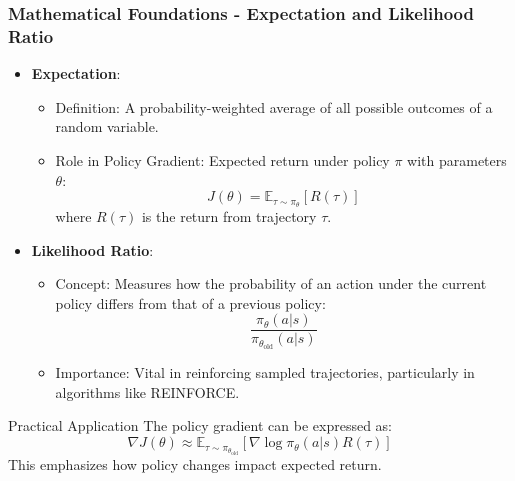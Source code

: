 \documentclass[aspectratio=169]{beamer}
\begin{document}
\begin{frame}[fragile]
    \frametitle{Mathematical Foundations - Expectation and Likelihood Ratio}
    \begin{itemize}
        \item \textbf{Expectation}:
          \begin{itemize}
            \item Definition: A probability-weighted average of all possible outcomes of a random variable.
            \item Role in Policy Gradient: Expected return under policy \( \pi \) with parameters \( \theta \):
              \[
              J(\theta) = \mathbb{E}_{\tau \sim \pi_{\theta}} [R(\tau)]
              \]
              where \( R(\tau) \) is the return from trajectory \( \tau \).
          \end{itemize}

        \item \textbf{Likelihood Ratio}:
          \begin{itemize}
            \item Concept: Measures how the probability of an action under the current policy differs from that of a previous policy:
              \[
              \frac{\pi_{\theta}(a|s)}{\pi_{\theta_{\text{old}}}(a|s)}
              \]
            \item Importance: Vital in reinforcing sampled trajectories, particularly in algorithms like REINFORCE.
          \end{itemize}
    \end{itemize}
    
    \begin{block}{Practical Application}
        The policy gradient can be expressed as:
        \[
        \nabla J(\theta) \approx \mathbb{E}_{\tau \sim \pi_{\theta_{\text{old}}}} \left[ \nabla \log \pi_{\theta}(a|s) R(\tau) \right]
        \]
        This emphasizes how policy changes impact expected return.
    \end{block}
\end{frame}
\end{document}
